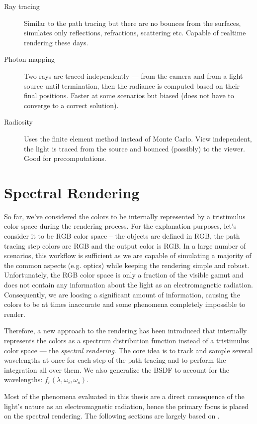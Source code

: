 \begin{description}
	\item[Ray tracing]\cite{glassner1989introduction} Similar to the path tracing but there are no bounces from the surfaces, simulates only reflections, refractions, scattering etc. Capable of realtime rendering these days.
	\item[Photon mapping]\cite{jensen2001realistic} Two rays are traced independently --- from the camera and from a light source until termination, then the radiance is computed based on their final positions. Faster at some scenarios but biased (does not have to converge to a correct solution).
	\item[Radiosity]\cite{sillion1994radiosity}Uses the finite element method instead of Monte Carlo. View independent, the light is traced from the source and bounced (possibly) to the viewer. Good for precomputations. 
\end{description}

\section{Spectral Rendering}

So far, we've considered the colors to be internally represented by a tristimulus color space during the rendering process. For the explanation purposes, let's consider it to be RGB color space -- the objects are defined in RGB, the path tracing step colors are RGB and the output color is RGB. In a large number of scenarios, this workflow is sufficient as we are capable of simulating a majority of the common aspects (e.g. optics) while keeping the rendering simple and robust. Unfortunately, the RGB color space is only a fraction of the visible gamut and does not contain any information about the light as an electromagnetic radiation. Consequently, we are loosing a significant amount of information, causing the colors to be at times inaccurate and some phenomena completely impossible to render. 

Therefore, a new approach to the rendering has been introduced that internally represents the colors as a spectrum distribution function instead of a tristimulus color space --- the \emph{spectral rendering}. The core idea is to track and sample several wavelengths at once for each step of the path tracing and to perform the integration all over them. We also generalize the BSDF to account for the wavelengths: $f_r(\lambda,\omega_i,\omega_o)$.

Most of the phenomena evaluated in this thesis are a direct consequence of the light's nature as an electromagnetic radiation, hence the primary focus is placed on the spectral rendering.
The following sections are largely based on \citet{wilkie2002tone}.

